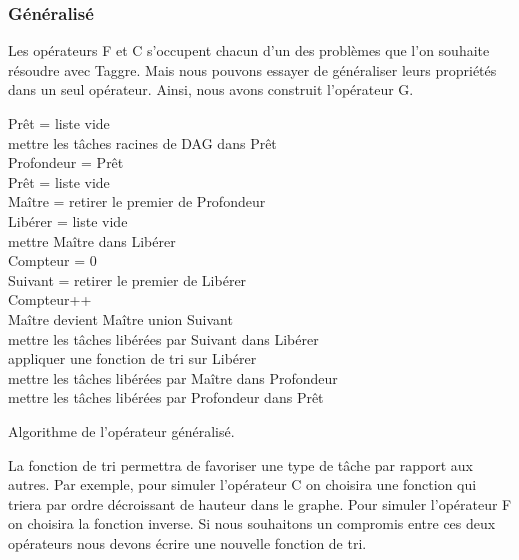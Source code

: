 \subsubsection{Généralisé}
Les opérateurs F et C s'occupent chacun d'un des problèmes que l'on souhaite résoudre avec Taggre.
%
Mais nous pouvons essayer de généraliser leurs propriétés dans un seul opérateur.
%
Ainsi, nous avons construit l'opérateur G.

\begin{algorithm}
  {\sc Prêt} = liste vide \\
  mettre les tâches racines de DAG dans {\sc Prêt} \\
   {
    {\sc Profondeur} = {\sc Prêt} \\
    {\sc Prêt} = liste vide \\
     {
      {\sc Maître} = retirer le premier de {\sc Profondeur} \\
      {\sc Libérer} = liste vide \\
      mettre {\sc Maître} dans {\sc Libérer} \\
      {\sc Compteur} = 0 \\
       {
        {\sc Suivant} = retirer le premier de {\sc Libérer} \\
        {\sc Compteur}++\\
        {\sc Maître} devient {\sc Maître} union {\sc Suivant}\\
        mettre les tâches libérées par {\sc Suivant} dans {\sc Libérer} \\
        appliquer une fonction de tri sur {\sc Libérer} \\
      }
      mettre les tâches libérées par {\sc Maître} dans {\sc Profondeur} \\
    }
    mettre les tâches libérées par {\sc Profondeur} dans {\sc Prêt}\\
  }
  \caption{Algorithme de l'opérateur généralisé.}
  \label{algo:algo_G}
\end{algorithm}


La fonction de tri permettra de favoriser une type de tâche par rapport aux autres.
%
Par exemple, pour simuler l'opérateur C on choisira une fonction qui triera par ordre décroissant de hauteur dans le graphe.
%
Pour simuler l'opérateur F on choisira la fonction inverse.
%
Si nous souhaitons un compromis entre ces deux opérateurs nous devons écrire une nouvelle fonction de tri.
